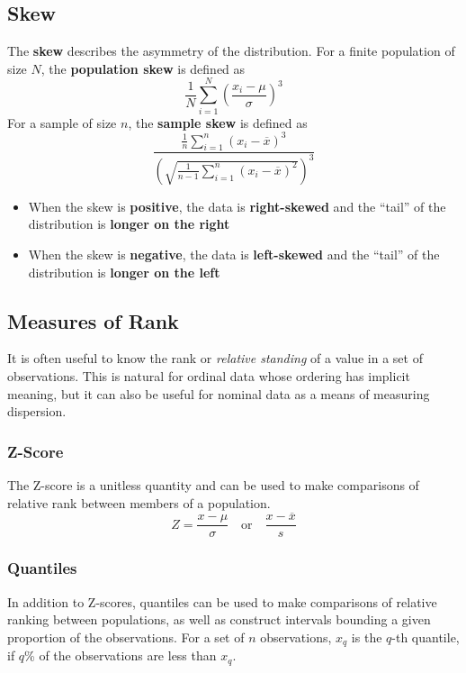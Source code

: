 \documentclass{article}
\begin{document}
\subsection{Skew}
The \textbf{skew} describes the asymmetry of the distribution. For a
finite population of size \(N\), the \textbf{population skew} is
defined as
\begin{equation*}
    \frac{1}{N} \sum_{i = 1}^N \left( \frac{x_i - \mu}{\sigma} \right)^3
\end{equation*}
For a sample of size \(n\), the \textbf{sample skew} is defined as
\begin{equation*}
    \frac{\frac{1}{n} \sum_{i = 1}^n \left( x_i - \overline{x} \right)^3}{\left( \sqrt{\frac{1}{n - 1} \sum_{i = 1}^n \left( x_i - \overline{x} \right)^2} \right)^3}
\end{equation*}
\begin{itemize}
    \item When the skew is \textbf{positive}, the data is
          \textbf{right-skewed} and the ``tail'' of the distribution is
          \textbf{longer on the right}
    \item When the skew is \textbf{negative}, the data is
          \textbf{left-skewed} and the ``tail'' of the distribution is
          \textbf{longer on the left}
\end{itemize}
\subsection{Measures of Rank}
It is often useful to know the rank or \textit{relative standing} of a
value in a set of observations. This is natural for ordinal data whose
ordering has implicit meaning, but it can also be useful for nominal
data as a means of measuring dispersion.
\subsubsection{Z-Score}
The Z-score is a unitless quantity and can be used to make comparisons
of relative rank between members of a population.
\begin{equation*}
    Z = \frac{x  - \mu}{\sigma} \quad \text{or} \quad \frac{x - \overline{x}}{s}
\end{equation*}
\subsubsection{Quantiles}
In addition to Z-scores, quantiles can be used to make comparisons of
relative ranking between populations, as well as construct intervals
bounding a given proportion of the observations. For a set of \(n\)
observations, \(x_q\) is the \(q\)-th quantile, if \(q\)\% of the
observations are less than \(x_q\).
\end{document}
